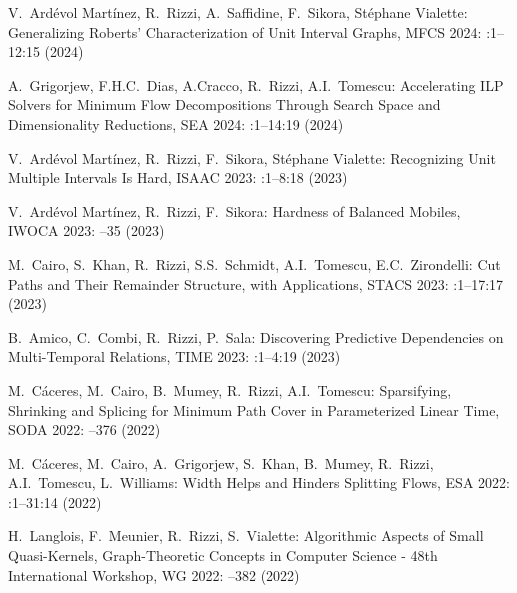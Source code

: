 
\begin{etaremune}
\item {\sc V.~Ardévol Martínez, R.~Rizzi, A.~Saffidine, F.~Sikora, Stéphane Vialette:}
   \newblock Generalizing Roberts' Characterization of Unit Interval Graphs,
   \newblock  MFCS 2024:
   :1--12:15 (2024)

\item {\sc A.~Grigorjew, F.H.C.~Dias, A.Cracco, R.~Rizzi, A.I.~Tomescu:}
   \newblock Accelerating ILP Solvers for Minimum Flow Decompositions Through Search Space and Dimensionality Reductions,
   \newblock  SEA 2024:
   :1--14:19 (2024)

\item {\sc V.~Ardévol Martínez, R.~Rizzi, F.~Sikora, Stéphane Vialette:}
   \newblock Recognizing Unit Multiple Intervals Is Hard,
   \newblock  ISAAC 2023:
   :1--8:18 (2023)

\item {\sc V.~Ardévol Martínez, R.~Rizzi, F.~Sikora:}
   \newblock Hardness of Balanced Mobiles,
   \newblock  IWOCA 2023:
   --35 (2023)

\item {\sc M.~Cairo, S.~Khan, R.~Rizzi, S.S.~Schmidt, A.I.~Tomescu, E.C.~Zirondelli:}
   \newblock Cut Paths and Their Remainder Structure, with Applications,
   \newblock  STACS 2023:
   :1--17:17 (2023)

\item {\sc B.~Amico, C.~Combi, R.~Rizzi, P.~Sala:}
   \newblock Discovering Predictive Dependencies on Multi-Temporal Relations,
   \newblock  TIME 2023:
   :1--4:19 (2023)

\item {\sc M.~Cáceres, M.~Cairo, B.~Mumey, R.~Rizzi, A.I.~Tomescu:}
   \newblock Sparsifying, Shrinking and Splicing for Minimum Path Cover in Parameterized Linear Time,
   \newblock SODA 2022:
   --376 (2022)

\item {\sc M.~Cáceres, M.~Cairo, A.~Grigorjew, S.~Khan, B.~Mumey, R.~Rizzi, A.I.~Tomescu, L.~Williams:}
   \newblock Width Helps and Hinders Splitting Flows,
   \newblock ESA 2022:
   :1--31:14 (2022)

  \item {\sc H.~Langlois, F.~Meunier, R.~Rizzi, S.~Vialette:}
   \newblock Algorithmic Aspects of Small Quasi-Kernels,
   \newblock Graph-Theoretic Concepts in Computer Science - 48th International Workshop, WG 2022:
   --382 (2022)


\end{etaremune}
